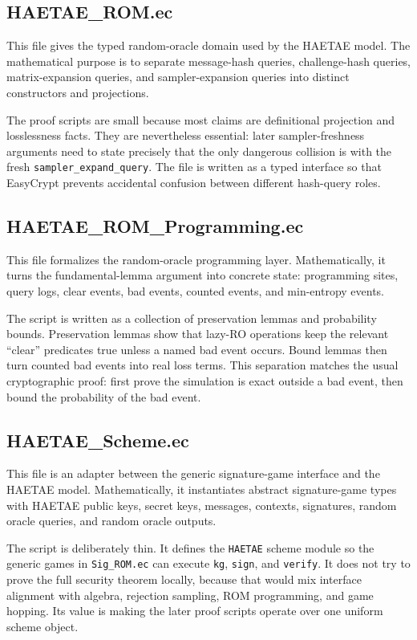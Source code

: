 \documentclass[11pt]{article}
\newcommand{\file}[1]{\nolinkurl{#1}}
\newcommand{\ec}[1]{\nolinkurl{#1}}
\begin{document}
\subsection*{HAETAE\_ROM.ec}

This file gives the typed random-oracle domain used by the HAETAE model.  The
mathematical purpose is to separate message-hash queries, challenge-hash
queries, matrix-expansion queries, and sampler-expansion queries into distinct
constructors and projections.

The proof scripts are small because most claims are definitional projection and
losslessness facts.  They are nevertheless essential: later sampler-freshness
arguments need to state precisely that the only dangerous collision is with the
fresh \ec{sampler_expand_query}.  The file is written as a typed interface so
that EasyCrypt prevents accidental confusion between different hash-query
roles.

\subsection*{HAETAE\_ROM\_Programming.ec}

This file formalizes the random-oracle programming layer.  Mathematically, it
turns the fundamental-lemma argument into concrete state: programming sites,
query logs, clear events, bad events, counted events, and min-entropy events.

The script is written as a collection of preservation lemmas and probability
bounds.  Preservation lemmas show that lazy-RO operations keep the relevant
``clear'' predicates true unless a named bad event occurs.  Bound lemmas then
turn counted bad events into real loss terms.  This separation matches the
usual cryptographic proof: first prove the simulation is exact outside a bad
event, then bound the probability of the bad event.

\subsection*{HAETAE\_Scheme.ec}

This file is an adapter between the generic signature-game interface and the
HAETAE model.  Mathematically, it instantiates abstract signature-game types
with HAETAE public keys, secret keys, messages, contexts, signatures, random
oracle queries, and random oracle outputs.

The script is deliberately thin.  It defines the \ec{HAETAE} scheme module so
the generic games in \file{Sig_ROM.ec} can execute \ec{kg}, \ec{sign}, and
\ec{verify}.  It does not try to prove the full security theorem locally,
because that would mix interface alignment with algebra, rejection sampling,
ROM programming, and game hopping.  Its value is making the later proof scripts
operate over one uniform scheme object.
\end{document}
